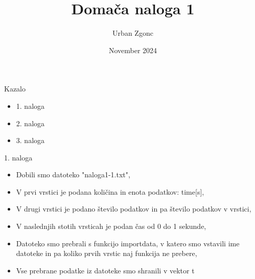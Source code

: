 \documentclass{beamer}
\title{Domača naloga 1}
\author{Urban Zgonc}
\date{November 2024}
\begin{document}
\maketitle

\begin{frame}{Kazalo}

\begin{itemize}
\item 1. naloga
\item 2. naloga
\item 3. naloga
\end{itemize}


\end{frame}


\begin{frame}{1. naloga}

\begin{itemize}
    \item  Dobili smo datoteko "naloga1-1.txt",
    
    \item  V prvi vrstici je podana količina in enota podatkov: time[s],
    \item  V drugi vrstici je podano število podatkov in pa število podatkov v vrstici,
    \item  V naslednjih stotih vrsticah je podan čas od 0 do 1 sekunde, 
    \item  Datoteko smo prebrali s funkcijo importdata, v katero smo vstavili ime datoteke in pa koliko prvih vrstic naj funkcija ne prebere,
    \item  Vse prebrane podatke iz datoteke smo shranili v vektor t
\end{itemize}  

\end{frame}
\end{document}
